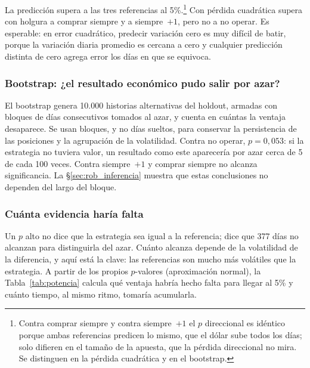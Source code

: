 \documentclass[10pt,a4paper]{article}
\begin{document}
La predicción supera a las tres referencias al 5\%.\footnote{Contra comprar siempre y
contra siempre~$+1$ el $p$ direccional es idéntico porque ambas referencias predicen lo
mismo, que el dólar sube todos los días; solo difieren en el tamaño de la apuesta, que
la pérdida direccional no mira. Se distinguen en la pérdida cuadrática y en el
bootstrap.} Con pérdida cuadrática supera con holgura a comprar siempre y a
siempre~$+1$, pero no a no operar. Es esperable: en error cuadrático, predecir variación
cero es muy difícil de batir, porque la variación diaria promedio es cercana a cero y
cualquier predicción distinta de cero agrega error los días en que se equivoca.

\subsubsection{Bootstrap: ¿el resultado económico pudo salir por azar?}

El bootstrap genera 10.000 historias alternativas del holdout, armadas con bloques de
días consecutivos tomados al azar, y cuenta en cuántas la ventaja desaparece. Se usan
bloques, y no días sueltos, para conservar la persistencia de las posiciones y la
agrupación de la volatilidad. Contra no operar, $p=0{,}053$: si la estrategia no
tuviera valor, un resultado como este aparecería por azar cerca de 5 de cada 100 veces.
Contra siempre~$+1$ y comprar siempre no alcanza significancia. La
§\ref{sec:rob_inferencia} muestra que estas conclusiones no dependen del largo del
bloque.

\subsubsection{Cuánta evidencia haría falta}

Un $p$ alto no dice que la estrategia sea igual a la referencia; dice que 377 días no
alcanzan para distinguirla del azar. Cuánto alcanza depende de la volatilidad de la
diferencia, y aquí está la clave: las referencias son mucho más volátiles que la
estrategia. A partir de los propios $p$-valores (aproximación normal), la
Tabla~\ref{tab:potencia} calcula qué ventaja habría hecho falta para llegar al 5\% y
cuánto tiempo, al mismo ritmo, tomaría acumularla.
\end{document}
